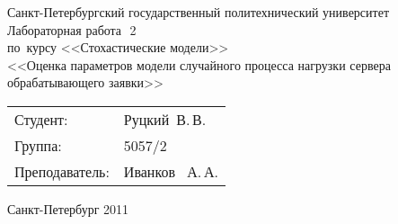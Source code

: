 %
%

\begin{titlepage} %

\begin{center} %

\large Санкт-Петербургский государственный политехнический университет\\[5.5cm]

\huge Лабораторная работа~\No\,2\\[0.6cm] %
\large по~курсу <<Стохастические модели>>\\[1cm]
\large <<Оценка параметров модели случайного процесса нагрузки сервера обрабатывающего заявки>>\\[6cm]

\begin{flushright} %
\begin{tabular}{l l}
Студент: & Руцкий~В.\,В.\\
Группа: & 5057/2\\
Преподаватель: & Иванков ~А.\,А.
\end{tabular}
\end{flushright} %

\vfill %

{\large Санкт-Петербург 2011}
\end{center} %
\thispagestyle{empty} %
\end{titlepage} %
